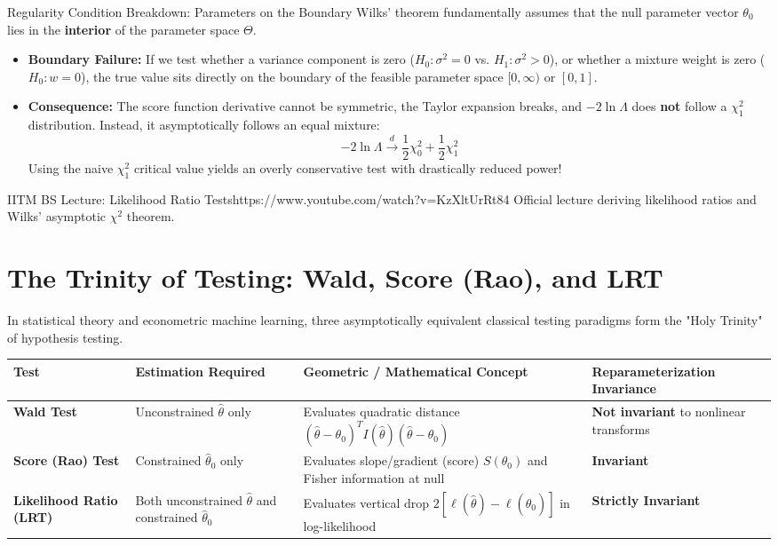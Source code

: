 \begin{trapbox}{Regularity Condition Breakdown: Parameters on the Boundary}
Wilks' theorem fundamentally assumes that the null parameter vector $\theta_0$ lies in the \textbf{interior} of the parameter space $\Theta$.
\begin{itemize}
    \item \textbf{Boundary Failure:} If we test whether a variance component is zero ($H_0 \colon \sigma^2 = 0$ vs. $H_1 \colon \sigma^2 > 0$), or whether a mixture weight is zero ($H_0 \colon w = 0$), the true value sits directly on the boundary of the feasible parameter space $[0, \infty)$ or $[0, 1]$.
    \item \textbf{Consequence:} The score function derivative cannot be symmetric, the Taylor expansion breaks, and $-2 \ln \Lambda$ does \textbf{not} follow a $\chi_1^2$ distribution. Instead, it asymptotically follows an equal mixture:
    $$-2 \ln \Lambda \xrightarrow{d} \frac{1}{2}\chi_0^2 + \frac{1}{2}\chi_1^2$$
    Using the naive $\chi_1^2$ critical value yields an overly conservative test with drastically reduced power!
\end{itemize}
\end{trapbox}

\begin{videocard}{IITM BS Lecture: Likelihood Ratio Tests}{https://www.youtube.com/watch?v=KzXltUrRt84}
Official lecture deriving likelihood ratios and Wilks' asymptotic $\chi^2$ theorem.
\end{videocard}

\section{The Trinity of Testing: Wald, Score (Rao), and LRT}

In statistical theory and econometric machine learning, three asymptotically equivalent classical testing paradigms form the "Holy Trinity" of hypothesis testing.

\begin{center}
\renewcommand{\arraystretch}{1.3}
\begin{tabular}{p{3.2cm}p{3.8cm}p{4.2cm}p{3.0cm}}
\toprule
\textbf{Test} & \textbf{Estimation Required} & \textbf{Geometric / Mathematical Concept} & \textbf{Reparameterization Invariance} \\
\midrule
\textbf{Wald Test} & Unconstrained $\hat{\theta}$ only & Evaluates quadratic distance $(\hat{\theta} - \theta_0)^T I(\hat{\theta})(\hat{\theta} - \theta_0)$ & \textbf{Not invariant} to nonlinear transforms \\
\textbf{Score (Rao) Test} & Constrained $\hat{\theta}_0$ only & Evaluates slope/gradient (score) $S(\theta_0)$ and Fisher information at null & \textbf{Invariant} \\
\textbf{Likelihood Ratio (LRT)} & Both unconstrained $\hat{\theta}$ and constrained $\hat{\theta}_0$ & Evaluates vertical drop $2[\ell(\hat{\theta}) - \ell(\hat{\theta}_0)]$ in log-likelihood & \textbf{Strictly Invariant} \\
\bottomrule
\end{tabular}
\end{center}

